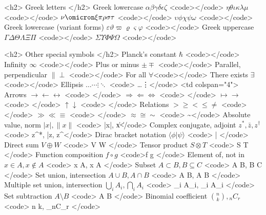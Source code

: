 <h2> Greek letters </h2>
 Greek lowercase 
 \(\alpha \beta \gamma \delta \epsilon \zeta\)  <code>\alpha \beta \gamma \delta \epsilon \zeta</code>  
 \(\eta \theta \iota \kappa \lambda \mu\)   <code>\eta \theta \iota \kappa \lambda \mu</code>  
 \(\nu \omicron \xi \pi \rho \sigma \tau\)   <code>\nu \omicron \xi \pi \rho \sigma \tau</code>  
 \(\upsilon \phi \chi \psi \omega\)          <code>\upsilon \phi \chi \psi \omega       </code>  
 Greek lowercase (variant forms) 
\(\varepsilon \vartheta \varpi \varrho \varsigma \varphi\)  <code>\varepsilon \vartheta \varpi \varrho \varsigma \varphi</code> 
 Greek uppercase 
\(\Gamma \Delta \Theta \Lambda \Xi \Pi\) <code>\Gamma \Delta \Theta \Lambda \Xi \Pi</code>  
\(\Sigma \Upsilon \Phi \Psi \Omega\)  <code>\Sigma \Upsilon \Phi \Psi \Omega</code>  

<h2> Other special symbols </h2>
 Planck's constant \(\hbar\) <code>\hbar</code>  
 Infinity \(\infty\) <code>\infty</code>  
 Plus or minus \(\pm \mp\) <code>\pm \mp</code>  
 Parallel, perpendicular \(\parallel \perp\) <code>\parallel \perp</code>  
 For all \(\forall\)<code>\forall</code>  
 There exists \(\exists\)<code>\exists</code>  
  Ellipsis  \(\dots \cdots \vdots \ddots\)  <code> \dots \cdots \vdots \ddots </code>  
 <td colspan="4"> Arrows 
 \(\rightarrow \leftarrow \leftrightarrow  \)  <code> \rightarrow \leftarrow \leftrightarrow </code>  
 \(\Rightarrow \Leftarrow \Leftrightarrow  \) <code> \Rightarrow \Leftarrow \Leftrightarrow </code>  
 \(\mapsto \to                             \) <code> \mapsto \to                            </code>  
 \(\uparrow \downarrow                     \) <code> \uparrow \downarrow                    </code>  
 Relations 
  \(\gt \geq \lt \leq \neq\)      <code> \gt \geq \lt \leq \neq </code>  
  \(\gg \ll \equiv \)            <code> \gg \ll \equiv         </code>  
  \(\approx \cong \sim \)       <code> \approx \cong \sim     </code>  
  Absolute value, norm   \(|x|, \|x\| \) <code> |x|, \|x\| </code>  
  Complex conjugate, adjoint \( z^*, \bar z, z^\dagger \)  <code> z^*, \bar z, z^\dagger </code>  
  Dirac bracket notation \(\langle \phi | \psi \rangle\)   <code> \langle \phi | \psi \rangle </code>  
  Direct sum \(V \oplus W\) <code> V \oplus W \)</code>  
  Tensor product \( S \otimes T \) <code> S \otimes T </code>  
  Function composition \( f \circ g  \) <code>f \circ g </code>  
  Element of, not in \( x \in A, x \not\in A \) <code> x \in A, x \not\in A </code>  
  Subset \( A \subset B, B \subseteq C \) <code> A \subset B, B \subseteq C </code>  
  Set union, intersection \( A \cup B, A \cap B \) <code> A \cup B, A \cap B </code>  
  Multiple set union, intersection \( \bigcup_i A_i, \bigcap_i A_i \) <code> \bigcup_i A_i, \bigcap_i A_i </code>  
  Set subtraction \( A \setminus B \) <code> A \setminus B </code>  
  Binomial coefficient \( \binom n k, {_nC_r} \) <code> \binom n k, {_nC_r} </code>  

